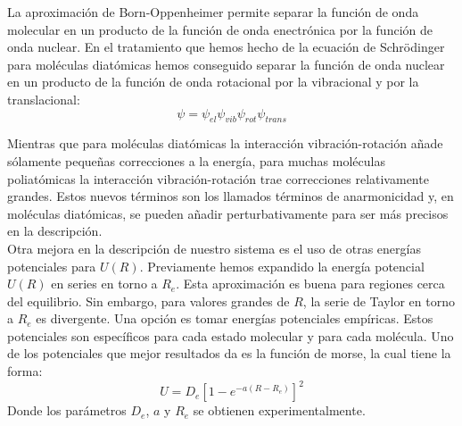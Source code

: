 \documentclass[a4paper]{article}
\begin{document}
La aproximación de Born-Oppenheimer permite separar la función de onda molecular en un producto de la función de onda enectrónica por la función de onda nuclear. En el tratamiento que hemos hecho de la ecuación de Schrödinger para moléculas diatómicas hemos conseguido separar la función de onda nuclear en un producto de la función de onda rotacional por la vibracional y por la translacional:
\begin{equation}
\psi=\psi_{el}\psi_{vib}\psi_{rot}\psi_{trans}
\end{equation}

Mientras que para moléculas diatómicas la interacción vibración-rotación añade sólamente pequeñas correcciones a la energía, para muchas moléculas poliatómicas la interacción vibración-rotación trae correcciones relativamente grandes. Estos nuevos términos son los llamados términos de anarmonicidad y, en moléculas diatómicas, se pueden añadir perturbativamente para ser más precisos en la descripción.\\

Otra mejora en la descripción de nuestro sistema es el uso de otras energías potenciales para $U(R)$. Previamente hemos expandido la energía potencial $U(R)$ en series en torno a $R_e$. Esta aproximación es buena para regiones cerca del equilibrio. Sin embargo, para valores grandes de $R$, la serie de Taylor en torno a $R_e$ es divergente. Una opción es tomar energías potenciales empíricas. Estos potenciales son específicos para cada estado molecular y para cada molécula. Uno de los potenciales que mejor resultados da es la función de morse, la cual tiene la forma:
\begin{equation}
U=D_e \left[ 1- e^{-a(R-R_e)} \right]^2
\end{equation}
Donde los parámetros $D_e$, $a$ y $R_e$ se obtienen experimentalmente.\\
\end{document}
